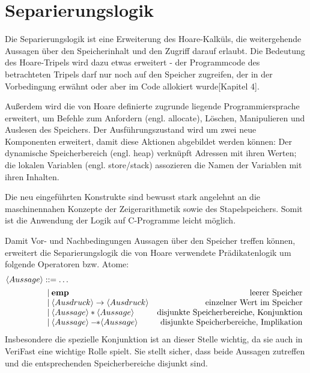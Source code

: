 \section{Separierungslogik}
\label{sec:theorie:seperation-logic}

Die Separierungslogik ist eine Erweiterung des Hoare-Kalküls, die weitergehende Aussagen über den Speicherinhalt
und den Zugriff darauf erlaubt. Die Bedeutung des Hoare-Tripels wird dazu etwas erweitert - der Programmcode des
betrachteten Tripels darf nur noch auf den Speicher zugreifen, der in der Vorbedingung erwähnt oder aber im Code
allokiert wurde\cite{reynolds-2002}[Kapitel 4].

Außerdem wird die von Hoare definierte zugrunde liegende Programmiersprache erweitert, um Befehle zum Anfordern (engl. allocate), 
Löschen, Manipulieren und Auslesen des Speichers. Der Ausführungszustand wird um zwei neue Komponenten erweitert, damit 
diese Aktionen abgebildet werden können: Der dynamische Speicherbereich (engl. heap) verknüpft Adressen mit ihren
Werten; die lokalen Variablen (engl. store/stack) assozieren die Namen der Variablen mit ihren Inhalten. 

Die neu eingeführten Konstrukte sind bewusst stark angelehnt an die maschinennahen Konzepte der Zeigerarithmetik sowie des
Stapelspeichers. Somit ist die Anwendung der Logik auf C-Programme leicht möglich.

Damit Vor- und Nachbedingungen Aussagen über den Speicher treffen können, erweitert die Separierungslogik die
von Hoare verwendete Prädikatenlogik um folgende Operatoren bzw. Atome: 
\begin{align*}
\langle Aussage \rangle & ::= \dots \\
& \begin{array}{l r}
  | \: \textbf{emp} & \textrm{leerer Speicher}\\
  | \: \langle Ausdruck \rangle \to \langle Ausdruck \rangle & \textrm{einzelner Wert im Speicher}\\
  | \: \langle Aussage \rangle \ast \langle Aussage \rangle & \textrm{disjunkte Speicherbereiche, Konjunktion}\\
  | \: \langle Aussage \rangle -\!\! \ast \langle Aussage \rangle & \textrm{disjunkte Speicherbereiche, Implikation}\\
\end{array}
\end{align*}
Insbesondere die spezielle Konjunktion ist an dieser Stelle wichtig, da sie auch in VeriFast eine wichtige Rolle spielt.
Sie stellt sicher, dass beide Aussagen zutreffen und die entsprechenden Speicherbereiche disjunkt sind. 

